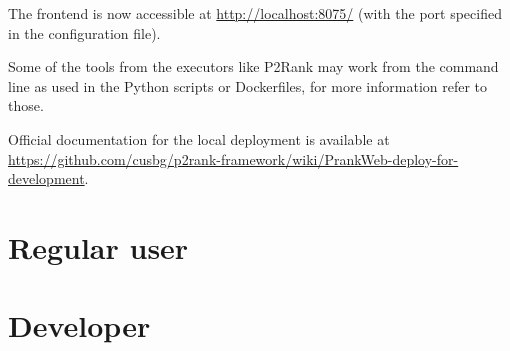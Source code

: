 The frontend is now accessible at \url{http://localhost:8075/} (with the port specified in the configuration file).

Some of the tools from the executors like P2Rank may work from the command line as used in the Python scripts or Dockerfiles, for more information refer to those.

Official documentation for the local deployment is available at \url{https://github.com/cusbg/p2rank-framework/wiki/PrankWeb-deploy-for-development}.


\section{Regular user}
\label{sec:regular_user}

\section{Developer}
\label{sec:developer}

